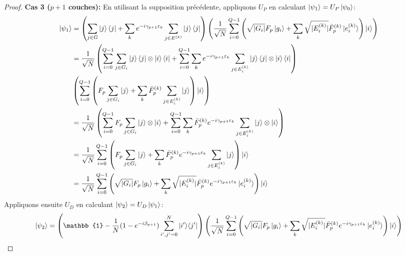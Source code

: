 \begin{proof}
\newpage
\textbf{Cas 3 ($p+1$ couches):}
En utilisant la supposition précédente, appliquons $U_{P}$ en calculant $\ket{\psi_{1}} = U_{P} \ket{\psi_{0}}$:
\begin{equation}
\begin{aligned}
\ket{\psi_{1}} & = \left(\sum_{j \in G} \ket{j}\bra{j} + \sum_{k} e^{-i \gamma_{p+1} \varepsilon_{k}} \sum_{j \in E^{(k)}} \ket{j}\bra{j} \right) \left( \frac{1}{\sqrt{ N }} \sum_{i=0}^{Q-1} \left( \sqrt{ \lvert G_{i} \rvert } F_{p} \ket{g_{i}} + \sum_{k} \sqrt{ \lvert E^{(k)}_{i} \rvert } \bar{F}^{(k)}_{p} \ket{e^{(k)}_{i}} \right) \ket{i} \right) \\
& = \frac{1}{\sqrt{ N }} \left( \sum_{i=0}^{Q-1} \sum_{j \in G_{i}} \ket{j}\bra{j} \otimes \ket{i}\bra{i} + \sum_{i=0}^{Q-1} \sum_{k} e^{-i \gamma_{p+1} \varepsilon_{k}} \sum_{j \in E^{(k)}_{i}} \ket{j}\bra{j} \otimes  \ket{i}\bra{i} \right) \\
& \left( \sum_{i=0}^{Q-1} \left( F_{p} \sum_{j \in G_{i}} \ket{j} + \sum_{k} \bar{F}^{(k)}_{p} \sum_{j \in E^{(k)}_{i} }\ket{j} \right) \ket{i} \right) \\
& = \frac{1}{\sqrt{ N }} \left( \sum_{i=0}^{Q-1}  F_{p} \sum_{j \in G_{i}}\ket{j} \otimes \ket{i} + \sum_{i=0}^{Q-1} \sum_{k} \bar{F}^{(k)}_{p} e^{-i \gamma_{p+1} \varepsilon_{k}} \sum_{j \in E^{(k)}_{i}} \ket{j} \otimes  \ket{i} \right) \\
& = \frac{1}{\sqrt{ N }} \sum_{i=0}^{Q-1} \left(  F_{p} \sum_{j \in G_{i}} \ket{j} + \sum_{k} \bar{F}^{(k)}_{p} e^{-i \gamma_{p+1} \varepsilon_{k}} \sum_{j \in E^{(k)}_{i}} \ket{j} \right) \ket{i} \\
& = \frac{1}{\sqrt{ N }} \sum_{i=0}^{Q-1} \left( \sqrt{ \lvert G_{i} \rvert  } F_{p} \ket{g_{i}} + \sum_{k} \sqrt{ \lvert E^{(k)}_{i} \rvert  }\bar{F}^{(k)}_{p} e^{-i \gamma_{p+1} \varepsilon_{k}} \ket{e^{(k)}_{i}} \right) \ket{i} \\
\end{aligned}
\end{equation}
Appliquons ensuite $U_{D}$ en calculant $\ket{\psi_{2}}=U_{D}\ket{\psi_{1}}$:
\begin{equation}
\begin{aligned}
\ket{\psi_{2}} &= \left( \mathbb{1} - \frac{1}{N} (1 - e^{-i\beta_{p+1}}) \sum_{i',j'=0}^{N} \ket{i'}\!\bra{j'} \right) \left( \frac{1}{\sqrt{ N }} \sum_{i=0}^{Q-1} \left( \sqrt{ \lvert G_{i} \rvert  } F_{p} \ket{g_{i}} + \sum_{k} \sqrt{ \lvert E^{(k)}_{i} \rvert  }\bar{F}^{(k)}_{p} e^{-i \gamma_{p+1} \varepsilon_{k}} \ket{e^{(k)}_{i}} \right) \ket{i} \right) \\

\end{aligned}
\end{equation}
\end{proof}
